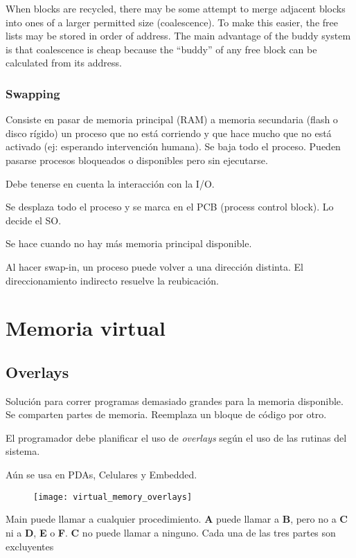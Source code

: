 \documentclass[a4paper, twoside]{article}
\begin{document}
When blocks are recycled, there may be some attempt to merge adjacent blocks into ones of a larger permitted size (coalescence). To make this easier, the free lists may be stored in order of address. The main advantage of the buddy system is that coalescence is cheap because the “buddy” of any free block can be calculated from its address.

\subsubsection{Swapping}
Consiste en pasar de memoria principal (RAM) a memoria secundaria (flash o disco rígido) un proceso que no está corriendo y que hace mucho que no está activado (ej: esperando intervención humana). Se baja todo el proceso. Pueden pasarse procesos bloqueados o disponibles pero sin ejecutarse.

Debe tenerse en cuenta la interacción con la I/O.

Se desplaza todo el proceso y se marca en el PCB (process control block). Lo decide el SO.

Se hace cuando no hay más memoria principal disponible. 

Al hacer swap-in, un proceso puede volver a una dirección distinta. El direccionamiento indirecto resuelve la reubicación.

\newpage
\section{Memoria virtual}
\subsection{Overlays}
Solución para correr programas demasiado grandes para la memoria disponible. Se comparten partes de memoria.
Reemplaza un bloque de código por otro.

El programador debe planificar el uso de \emph{overlays} según el uso de las rutinas del sistema.

Aún se usa en PDAs, Celulares y Embedded.

\begin{figure}[H]
	\centering
	\texttt{[image: virtual\_memory\_overlays]}
	\label{fig:virtual_memory_overlays}
\end{figure}

Main puede llamar a cualquier procedimiento.
\textbf{A} puede llamar a \textbf{B}, pero no a \textbf{C} ni a \textbf{D}, \textbf{E} o \textbf{F}. \textbf{C} no puede llamar a ninguno.
Cada una de las tres partes son excluyentes
\end{document}
